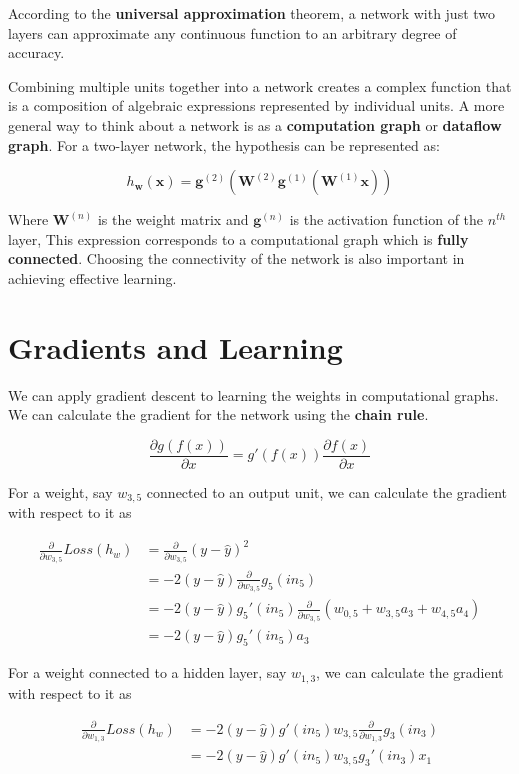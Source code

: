 \documentclass{article}
\begin{document}
According to the \textbf{universal approximation} theorem, a network with just two
layers can approximate any continuous function to an arbitrary degree of accuracy.

Combining multiple units together into a network creates a complex function that is
a composition of algebraic expressions represented by individual units. A more
general way to think about a network is as a \textbf{computation graph} or
\textbf{dataflow graph}. For a two-layer network, the hypothesis can be represented as:

\[
h_{\textbf{w}}(\textbf{x}) = \textbf{g}^{(2)} (\textbf{W}^{(2)}\textbf{g}^{(1)}(\textbf{W}^{(1)}\textbf{x}))
\]

Where $\textbf{W}^{(n)}$ is the weight matrix and $\textbf{g}^{(n)}$ is the activation
function of the $n^{th}$ layer, This expression corresponds to a computational graph
which is \textbf{fully connected}. Choosing the connectivity of the network is also
important in achieving effective learning.

\section{Gradients and Learning}

We can apply gradient descent to learning the weights in computational graphs.
We can calculate the gradient for the network using the \textbf{chain rule}.

\[
\frac{\partial g(f(x))}{\partial x} = g'(f(x)) \frac{\partial f(x)}{\partial x}
\]

For a weight, say $w_{3,5}$ connected to an output unit, we can calculate the gradient
with respect to it as

\begin{align*}
\frac{\partial}{\partial w_{3,5}} Loss(h_w) &= \frac{\partial}{\partial w_{3,5}}(y - \hat y)^2 \\
&= -2(y - \hat y) \frac{\partial}{\partial w_{3,5}} g_5(in_5) \\
&= -2(y - \hat y) g_5'(in_5) \frac{\partial}{\partial w_{3,5}} (w_{0,5} + w_{3,5}a_3 + w_{4,5}a_4) \\
&= -2(y - \hat y)g_5'(in_5)a_3
\end{align*}

For a weight connected to a hidden layer, say $w_{1,3}$, we can calculate the gradient
with respect to it as

\begin{align*}
\frac{\partial}{\partial w_{1,3}} Loss(h_w) &= -2(y - \hat y)g'(in_5) w_{3,5} \frac{\partial}{\partial w_{1,3}} g_3(in_3) \\
&= -2(y - \hat y)g'(in_5) w_{3,5} g_3'(in_3) x_1
\end{align*}
\end{document}
